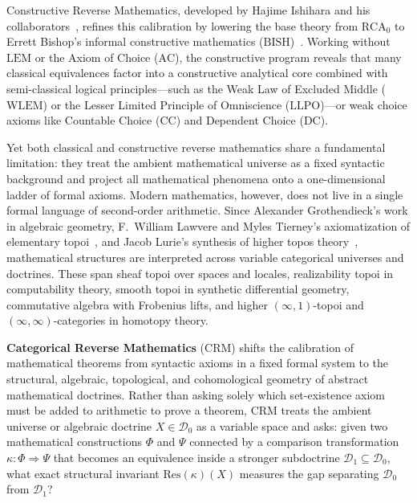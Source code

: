 \documentclass[10pt,twoside,openright]{book}
\theoremstyle{crmplain}
\theoremstyle{crmdef}
\theoremstyle{crmremark}
\begin{document}
Constructive Reverse Mathematics, developed by Hajime Ishihara and his collaborators~\cite{Ishihara06}, refines this calibration by lowering the base theory from $\mathrm{RCA}_0$ to Errett Bishop's informal constructive mathematics ($\mathrm{BISH}$)~\cite{Bishop67}. Working without $\mathrm{LEM}$ or the Axiom of Choice ($\mathrm{AC}$), the constructive program reveals that many classical equivalences factor into a constructive analytical core combined with semi-classical logical principles---such as the Weak Law of Excluded Middle ($\mathrm{WLEM}$) or the Lesser Limited Principle of Omniscience ($\mathrm{LLPO}$)---or weak choice axioms like Countable Choice ($\mathrm{CC}$) and Dependent Choice ($\mathrm{DC}$).

Yet both classical and constructive reverse mathematics share a fundamental limitation: they treat the ambient mathematical universe as a fixed syntactic background and project all mathematical phenomena onto a one-dimensional ladder of formal axioms. Modern mathematics, however, does not live in a single formal language of second-order arithmetic. Since Alexander Grothendieck's work in algebraic geometry, F.~William Lawvere and Myles Tierney's axiomatization of elementary topoi~\cite{MacLaneMoerdijk92,Johnstone02}, and Jacob Lurie's synthesis of higher topos theory~\cite{Lurie09}, mathematical structures are interpreted across variable categorical universes and doctrines. These span sheaf topoi over spaces and locales, realizability topoi in computability theory, smooth topoi in synthetic differential geometry, commutative algebra with Frobenius lifts, and higher $(\infty, 1)$-topoi and $(\infty, \infty)$-categories in homotopy theory.

\textbf{Categorical Reverse Mathematics} ($\mathrm{CRM}$) shifts the calibration of mathematical theorems from syntactic axioms in a fixed formal system to the structural, algebraic, topological, and cohomological geometry of abstract mathematical doctrines. Rather than asking solely which set-existence axiom must be added to arithmetic to prove a theorem, $\mathrm{CRM}$ treats the ambient universe or algebraic doctrine $X \in \mathcal{D}_0$ as a variable space and asks: given two mathematical constructions $\Phi$ and $\Psi$ connected by a comparison transformation $\kappa : \Phi \Rightarrow \Psi$ that becomes an equivalence inside a stronger subdoctrine $\mathcal{D}_1 \subseteq \mathcal{D}_0$, what exact structural invariant $\mathrm{Res}(\kappa)(X)$ measures the gap separating $\mathcal{D}_0$ from $\mathcal{D}_1$?
\end{document}
